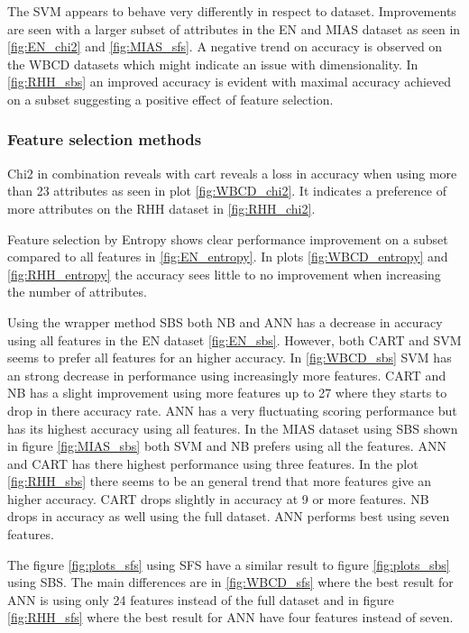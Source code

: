 
The SVM appears to behave very differently in respect to dataset. Improvements are seen with a larger subset of attributes in the EN and MIAS dataset as seen in \ref{fig:EN_chi2} and \ref{fig:MIAS_sfs}. A negative trend on accuracy is observed on the WBCD datasets which might indicate an issue with dimensionality. In \ref{fig:RHH_sbs} an improved accuracy is evident with maximal accuracy achieved on a subset suggesting a positive effect of feature selection.

\subsubsection{Feature selection methods}

Chi2 in combination reveals with cart reveals a loss in accuracy when using more than 23 attributes as seen in plot \ref{fig:WBCD_chi2}. It indicates a preference of more attributes on the RHH dataset in \ref{fig:RHH_chi2}.



Feature selection by Entropy shows clear performance improvement on a subset compared to all features in \ref{fig:EN_entropy}. In plots \ref{fig:WBCD_entropy} and \ref{fig:RHH_entropy} the accuracy sees little to no improvement when increasing the number of attributes.



Using the wrapper method SBS both NB and ANN has a decrease in accuracy using all features in the EN dataset \ref{fig:EN_sbs}. However, both CART and SVM seems to prefer all features for an higher accuracy. In \ref{fig:WBCD_sbs} SVM has an strong decrease in performance using increasingly more features. CART and NB has a slight improvement using more features up to 27 where they starts to drop in there accuracy rate. ANN has a very fluctuating scoring performance but has its highest accuracy using all features.  In the MIAS dataset using SBS shown in figure \ref{fig:MIAS_sbs} both SVM and NB prefers using all the features. ANN and CART has there highest performance using three features. In the plot \ref{fig:RHH_sbs} there seems to be an general trend that more features give an higher accuracy. CART drops slightly in accuracy at 9 or more features. NB drops in accuracy as well using the full dataset. ANN performs best using seven features.



The figure \ref{fig:plots_sfs} using SFS have a similar result to figure \ref{fig:plots_sbs} using SBS. The main differences are in \ref{fig:WBCD_sfs} where the best result for ANN is using only 24 features instead of the full dataset and in figure \ref{fig:RHH_sfs} where the best result for ANN have four features instead of seven.

